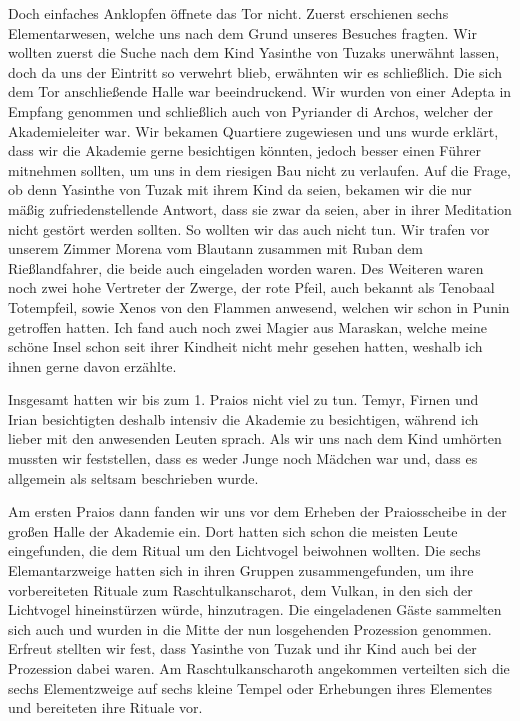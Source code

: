 Doch einfaches Anklopfen öffnete das Tor nicht. Zuerst erschienen sechs Elementarwesen, welche uns nach dem Grund unseres Besuches fragten. Wir wollten zuerst die Suche nach dem Kind Yasinthe von Tuzaks unerwähnt lassen, doch da uns der Eintritt so verwehrt blieb, erwähnten wir es schließlich. Die sich dem Tor anschließende Halle war beeindruckend. Wir wurden von einer Adepta in Empfang genommen und schließlich auch von Pyriander di Archos, welcher der Akademieleiter war. Wir bekamen Quartiere zugewiesen und uns wurde erklärt, dass wir die Akademie gerne besichtigen könnten, jedoch besser einen Führer mitnehmen sollten, um uns in dem riesigen Bau nicht zu verlaufen. Auf die Frage, ob denn Yasinthe von Tuzak mit ihrem Kind da seien, bekamen wir die nur mäßig zufriedenstellende Antwort, dass sie zwar da seien, aber in ihrer Meditation nicht gestört werden sollten. So wollten wir das auch nicht tun. Wir trafen vor unserem Zimmer Morena vom Blautann zusammen mit Ruban dem Rießlandfahrer, die beide auch eingeladen worden waren. Des Weiteren waren noch zwei hohe Vertreter der Zwerge, der rote Pfeil, auch bekannt als Tenobaal Totempfeil, sowie Xenos von den Flammen anwesend, welchen wir schon in Punin getroffen hatten. Ich fand auch noch zwei Magier aus Maraskan, welche meine schöne Insel schon seit ihrer Kindheit nicht mehr gesehen hatten, weshalb ich ihnen gerne davon erzählte.

Insgesamt hatten wir bis zum 1. Praios nicht viel zu tun. Temyr, Firnen und Irian besichtigten deshalb intensiv die Akademie zu besichtigen, während ich lieber mit den anwesenden Leuten sprach. Als wir uns nach dem Kind umhörten mussten wir feststellen, dass es weder Junge noch Mädchen war und, dass es allgemein als seltsam beschrieben wurde.

Am ersten Praios dann fanden wir uns vor dem Erheben der Praiosscheibe in der großen Halle der Akademie ein. Dort hatten sich schon die meisten Leute eingefunden, die dem Ritual um den Lichtvogel beiwohnen wollten. Die sechs Elemantarzweige hatten sich in ihren Gruppen zusammengefunden, um ihre vorbereiteten Rituale zum Raschtulkanscharot, dem Vulkan, in den sich der Lichtvogel hineinstürzen würde, hinzutragen. Die eingeladenen Gäste sammelten sich auch und wurden in die Mitte der nun losgehenden Prozession genommen. Erfreut stellten wir fest, dass Yasinthe von Tuzak und ihr Kind auch bei der Prozession dabei waren. Am Raschtulkanscharoth angekommen verteilten sich die sechs Elementzweige auf sechs kleine Tempel oder Erhebungen ihres Elementes und bereiteten ihre Rituale vor. 

